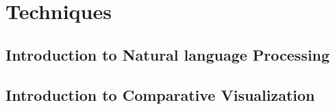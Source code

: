 \chapter{Techniques}
\label{techniques}

\section{Introduction to Natural language Processing}

\section{Introduction to Comparative Visualization}

